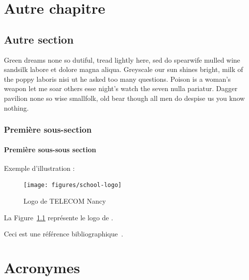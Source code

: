 \documentclass{tnreport}
\begin{document}
\chapter{Autre chapitre}

\section{Autre section}

Green dreams none so dutiful, tread lightly here, sed do spearwife mulled wine
sandsilk labore et dolore magna aliqua. Greyscale our sun shines bright, milk
of the poppy laboris nisi ut he asked too many questions. Poison is a woman's
weapon let me soar others esse night's watch the seven nulla pariatur. Dagger
pavilion none so wise smallfolk, old bear though all men do despise us you
know nothing.


\subsection{Première sous-section}

\subsubsection{Première sous-sous section}

Exemple d'illustration :

\begin{figure}[h]
  \centering
  \texttt{[image: figures/school-logo]}
  \caption{Logo de TELECOM Nancy}
  \label{fig:logo-tn}
\end{figure}

La Figure~\ref{fig:logo-tn} représente le logo de \reportSchool{}.

Ceci est une référence bibliographique~\cite{GOT4}.

\cleardoublepage
\renewcommand{\tocbibname}{Bibliographie / Webographie}


\cleardoublepage

\listoffigures
\cleardoublepage

\listoftables
\cleardoublepage

\lstlistoflistings
\cleardoublepage

\chapter*{Acronymes}
\cleardoublepage
\end{document}
